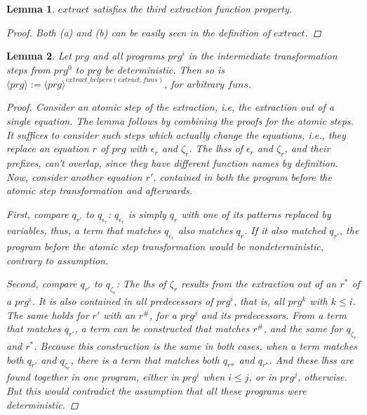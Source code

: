\documentclass[11pt]{article} %
\newtheorem*{lemma*}{Lemma}
\begin{document}
\begin{lemma*}

$extract$ satisfies the third extraction function property.

\begin{proof}

Both (a) and (b) can be easily seen in the definition of $extract$.

\end{proof}

\end{lemma*}

\begin{lemma*}

Let $prg$ and all programs $prg^i$ in the intermediate transformation steps from $prg^0$ to $prg$ be deterministic. Then so is $\langle prg \rangle := \langle prg \rangle^{extract\_helpers(extract, funs)}$, for arbitrary $funs$.

\begin{proof}

Consider an atomic step of the extraction, i.e, the extraction out of a single equation. The lemma follows by combining the proofs for the atomic steps. It suffices to consider such steps which actually change the equations, i.e., they replace an equation $r$ of $prg$ with $\epsilon_r$ and $\zeta_r$. The lhss of $\epsilon_r$ and $\zeta_r$, and their prefixes, can't overlap, since they have different function names by definition. Now, consider another equation $r'$, contained in both the program before the atomic step transformation and afterwards.

First, compare $q_{r'}$ to $q_{\epsilon_r}$: $q_{\epsilon_r}$ is simply $q_r$ with one of its patterns replaced by variables, thus, a term that matches $q_{\epsilon_r}$ also matches $q_r$. If it also matched $q_{r'}$, the program before the atomic step transformation would be nondeterministic, contrary to assumption.

Second, compare $q_{r'}$ to $q_{\zeta_r}$: The lhs of $\zeta_r$ results from the extraction out of an $r^*$ of a $prg^i$. It is also contained in all predecessors of $prg^i$, that is, all $prg^k$ with $k \leq i$. The same holds for $r'$ with an $r^\#$, for a $prg^j$ and its predecessors. From a term that matches $q_{r'}$, a term can be constructed that matches $r^\#$, and the same for $q_{\zeta_r}$ and $r^*$. Because this construction is the same in both cases, when a term matches both $q_{r'}$ and $q_{\zeta_r}$, there is a term that matches both $q_{r^\#}$ and $q_{r^*}$. And these lhss are found together in one program, either in $prg^i$ when $i \leq j$, or in $prg^j$, otherwise. But this would contradict the assumption that all these programs were deterministic.

\end{proof}

\end{lemma*}
\end{document}
